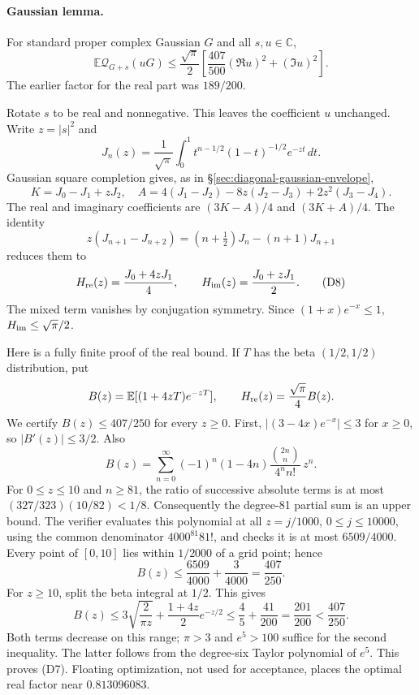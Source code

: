 \paragraph{Gaussian lemma.}
For standard proper complex Gaussian $G$ and all $s,u\in\mathbb C$,
\[
\boxed{\quad
 \mathbb E\mathcal Q_{G+s}(uG)
 \le\frac{\sqrt\pi}{2}
       \left[\frac{407}{500}(\Re u)^2+(\Im u)^2\right].
 \quad}
 \tag{D7}
\]
The earlier factor for the real part was $189/200$.

Rotate $s$ to be real and nonnegative. This leaves the coefficient $u$
unchanged. Write $z=|s|^2$ and
\[
 J_n(z)=\frac1{\sqrt\pi}\int_0^1
       t^{n-1/2}(1-t)^{-1/2}e^{-zt}\,dt.
\]
Gaussian square completion gives, as in \S\ref{sec:diagonal-gaussian-envelope},
\[
 K=J_0-J_1+zJ_2,\quad
 A=4(J_1-J_2)-8z(J_2-J_3)+2z^2(J_3-J_4).
\]
The real and imaginary coefficients are $(3K-A)/4$ and $(3K+A)/4$.
The identity
\[
 z(J_{n+1}-J_{n+2})=(n+\tfrac12)J_n-(n+1)J_{n+1}
\]
reduces them to
\[
 H_{\rm re}(z)=\frac{J_0+4zJ_1}{4},\qquad
 H_{\rm im}(z)=\frac{J_0+zJ_1}{2}.
 \tag{D8}
\]
The mixed term vanishes by conjugation symmetry. Since
$(1+x)e^{-x}\le1$, $H_{\rm im}\le\sqrt\pi/2$.

Here is a fully finite proof of the real bound. If $T$ has the beta
$(1/2,1/2)$ distribution, put
\[
 B(z)=\mathbb E[(1+4zT)e^{-zT}],\qquad
 H_{\rm re}(z)=\frac{\sqrt\pi}{4}B(z).
\]
We certify $B(z)\le407/250$ for every $z\ge0$.
First, $|(3-4x)e^{-x}|\le3$ for $x\ge0$, so $|B'(z)|\le3/2$.
Also
\[
 B(z)=\sum_{n=0}^{\infty}
   (-1)^n(1-4n)\frac{\binom{2n}{n}}{4^n n!}\,z^n.
 \tag{D9}
\]
For $0\le z\le10$ and $n\ge81$, the ratio of successive absolute
terms is at most $(327/323)(10/82)<1/8$.
Consequently the degree-81 partial sum is an upper bound.
The verifier evaluates this polynomial at all $z=j/1000$,
$0\le j\le10000$, using the common denominator $4000^{81}81!$,
and checks it is at most $6509/4000$.
Every point of $[0,10]$ lies within $1/2000$ of a grid point; hence
\[
 B(z)\le\frac{6509}{4000}+\frac3{4000}=\frac{407}{250}.
\]
For $z\ge10$, split the beta integral at $1/2$. This gives
\[
 B(z)\le3\sqrt{\frac2{\pi z}}+\frac{1+4z}{2}e^{-z/2}
 \le\frac45+\frac{41}{200}=\frac{201}{200}<\frac{407}{250}.
\]
Both terms decrease on this range; $\pi>3$ and $e^5>100$ suffice
for the second inequality. The latter follows from the degree-six
Taylor polynomial of $e^5$.
This proves (D7). Floating optimization, not used for acceptance,
places the optimal real factor near $0.813096083$.

